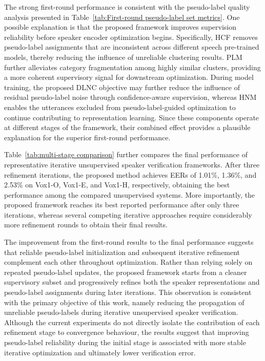 \documentclass[lettersize,journal]{IEEEtran}
\begin{document}
The strong first-round performance is consistent with the pseudo-label quality analysis presented in Table~\ref{tab:First-round pseudo-label set metrics}. One possible explanation is that the proposed framework improves supervision reliability before speaker encoder optimization begins. Specifically, HCF removes pseudo-label assignments that are inconsistent across different speech pre-trained models, thereby reducing the influence of unreliable clustering results. PLM further alleviates category fragmentation among highly similar clusters, providing a more coherent supervisory signal for downstream optimization. During model training, the proposed DLNC objective may further reduce the influence of residual pseudo-label noise through confidence-aware supervision, whereas HNM enables the utterances excluded from pseudo-label-guided optimization to continue contributing to representation learning. Since these components operate at different stages of the framework, their combined effect provides a plausible explanation for the superior first-round performance.

Table~\ref{tab:multi-stage comparison} further compares the final performance of representative iterative unsupervised speaker verification frameworks. After three refinement iterations, the proposed method achieves EERs of 1.01\%, 1.36\%, and 2.53\% on Vox1-O, Vox1-E, and Vox1-H, respectively, obtaining the best performance among the compared unsupervised systems. More importantly, the proposed framework reaches its best reported performance after only three iterations, whereas several competing iterative approaches require considerably more refinement rounds to obtain their final results.

The improvement from the first-round results to the final performance suggests that reliable pseudo-label initialization and subsequent iterative refinement complement each other throughout optimization. Rather than relying solely on repeated pseudo-label updates, the proposed framework starts from a cleaner supervisory subset and progressively refines both the speaker representations and pseudo-label assignments during later iterations. This observation is consistent with the primary objective of this work, namely reducing the propagation of unreliable pseudo-labels during iterative unsupervised speaker verification. Although the current experiments do not directly isolate the contribution of each refinement stage to convergence behaviour, the results suggest that improving pseudo-label reliability during the initial stage is associated with more stable iterative optimization and ultimately lower verification error.
\end{document}
